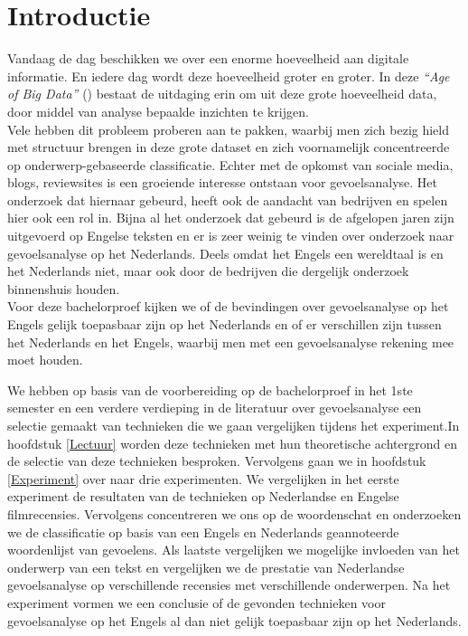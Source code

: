 \chapter{Introductie}\label{introductie}

Vandaag de dag beschikken we over een enorme hoeveelheid aan digitale informatie. En iedere dag wordt deze hoeveelheid groter en groter.
In deze \textit{``Age of Big Data''} (\cite{lohr2012age}) bestaat de uitdaging erin om uit deze grote hoeveelheid data, door middel van analyse bepaalde inzichten te krijgen.
\\
Vele hebben dit probleem proberen aan te pakken, waarbij men zich bezig hield met structuur brengen in deze grote dataset en zich voornamelijk concentreerde op onderwerp-gebaseerde classificatie. Echter met de opkomst van sociale media, blogs, reviewsites is een groeiende interesse ontstaan voor gevoelsanalyse. Het onderzoek dat hiernaar gebeurd, heeft ook de aandacht van bedrijven en spelen hier ook een rol in. Bijna al het onderzoek dat gebeurd is de afgelopen jaren zijn uitgevoerd op Engelse teksten en er is zeer weinig te vinden over onderzoek naar gevoelsanalyse op het Nederlands. Deels omdat het Engels een wereldtaal is en het Nederlands niet, maar ook door de bedrijven die dergelijk onderzoek binnenshuis houden.
\\
Voor deze bachelorproef kijken we of de bevindingen over gevoelsanalyse op het Engels gelijk toepasbaar zijn op het Nederlands en of er verschillen zijn tussen het Nederlands en het Engels, waarbij men met een gevoelsanalyse rekening mee moet houden.

We hebben op basis van de voorbereiding op de bachelorproef in het 1ste semester en  een verdere verdieping in de literatuur over gevoelsanalyse een selectie gemaakt van technieken die we gaan vergelijken tijdens het experiment.In hoofdstuk \ref{Lectuur} worden deze technieken met hun theoretische achtergrond en de selectie van deze technieken besproken. Vervolgens gaan we in hoofdstuk \ref{Experiment} over naar drie experimenten. We vergelijken in het eerste experiment de resultaten van de technieken op Nederlandse en Engelse filmrecensies. Vervolgens concentreren we ons op de woordenschat en  onderzoeken we de classificatie op basis van een Engels en Nederlands geannoteerde woordenlijst van gevoelens. Als laatste vergelijken we mogelijke invloeden van het onderwerp van een tekst en vergelijken we de prestatie van Nederlandse gevoelsanalyse op verschillende recensies met verschillende onderwerpen. Na het experiment vormen we een conclusie of de gevonden technieken voor gevoelsanalyse op het Engels al dan niet gelijk toepasbaar zijn op het Nederlands. 